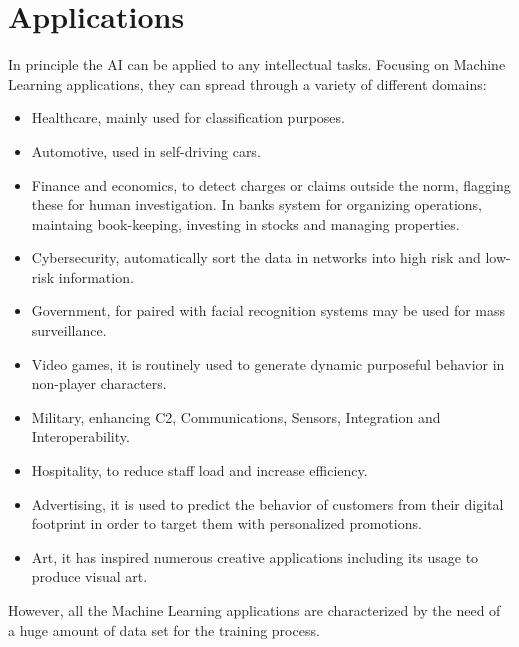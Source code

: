 \section{Applications}
In principle the AI can be applied to any intellectual tasks. Focusing on Machine Learning applications, they can spread through a variety of different domains:
\begin{itemize}
\item Healthcare, mainly used for classification purposes.
\item Automotive, used in self-driving cars.
\item Finance and economics, to detect charges or claims outside the norm, flagging these for human investigation. In banks system for organizing operations, maintaing book-keeping, investing in stocks and managing properties.
\item Cybersecurity, automatically sort the data in networks into high risk and low-risk information.
\item Government, for paired with facial recognition systems may be used for mass surveillance.
\item Video games, it is routinely used to generate dynamic purposeful behavior in non-player characters.
\item Military, enhancing C2, Communications, Sensors, Integration and Interoperability.
\item Hospitality, to reduce staff load and increase efficiency.
\item Advertising, it is used to predict the behavior of customers from their digital footprint in order to target them with personalized promotions.
\item Art, it has inspired numerous creative applications including its usage to produce visual art.
\end{itemize}
However, all the Machine Learning applications are characterized by the need of a huge amount of data set for the training process.